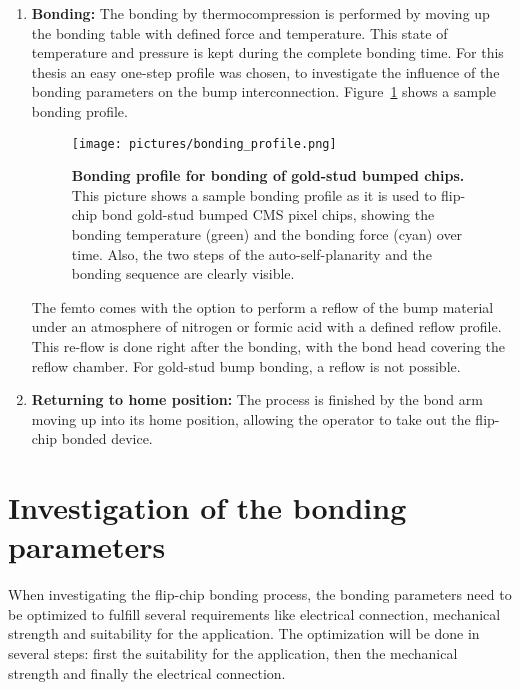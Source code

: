 \begin{enumerate}
\item \textbf{Bonding:} The bonding by thermocompression is performed by moving up the bonding table with defined force and temperature. This state of temperature and pressure is kept during the complete bonding time. For this thesis an easy one-step profile was chosen, to investigate the influence of the bonding parameters on the bump interconnection. Figure~\ref{pic:bonding_profile} shows a sample bonding profile.
\begin{figure}
\begin{center}
\texttt{[image: pictures/bonding\_profile.png]}
\end{center}
\caption[Bonding profile for bonding of gold-stud bumped chips]{\textbf{Bonding profile for bonding of gold-stud bumped chips.} This picture shows a sample bonding profile as it is used to flip-chip bond gold-stud bumped \ac{CMS} pixel chips, showing the bonding temperature (green) and the bonding force (cyan) over time. Also, the two steps of the auto-self-planarity and the bonding sequence are clearly visible.}\label{pic:bonding_profile}
\end{figure}
The femto comes with the option to perform a reflow of the bump material under an atmosphere of nitrogen or formic acid with a defined reflow profile. This re-flow is done right after the bonding, with the bond head covering the reflow chamber. For gold-stud bump bonding, a reflow is not possible.
\item \textbf{Returning to home position:} The process is finished by the bond arm moving up into its home position, allowing the operator to take out the flip-chip bonded device.
\end{enumerate}






\section{Investigation of the bonding parameters}
When investigating the flip-chip bonding process, the bonding parameters need to be optimized to fulfill several requirements like electrical connection, mechanical strength and suitability for the application. The optimization will be done in several steps: first the suitability for the application, then the mechanical strength and finally the electrical connection.

